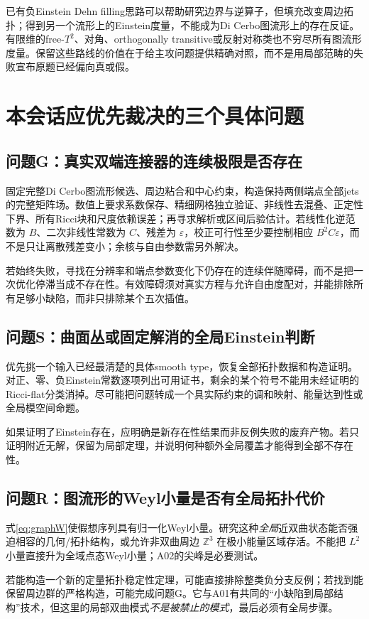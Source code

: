 \documentclass[UTF8,a4paper,11pt,fontset=fandol]{ctexart}
\numberwithin{equation}{section}
\theoremstyle{definition}
\newcommand{\Z}{\mathbb Z}
\begin{document}
已有负Einstein Dehn filling思路可以帮助研究边界与逆算子，但填充改变周边拓扑；得到另一个流形上的Einstein度量，不能成为Di Cerbo图流形上的存在反证。有限维的free-$T^2$、对角、orthogonally transitive或反射对称类也不穷尽所有图流形度量。保留这些路线的价值在于给主攻问题提供精确对照，而不是用局部范畴的失败宣布原题已经偏向真或假。

\section{本会话应优先裁决的三个具体问题}
\subsection{问题G：真实双端连接器的连续极限是否存在}
固定完整Di Cerbo图流形候选、周边粘合和中心约束，构造保持两侧端点全部jets的完整矩阵场。数值上要求系数保存、精细网格独立验证、非线性去混叠、正定性下界、所有Ricci块和尺度依赖误差；再寻求解析或区间后验估计。若线性化逆范数为 $B$、二次非线性常数为 $C$、残差为 $\varepsilon$，校正可行性至少要控制相应 $B^2C\varepsilon$，而不是只让离散残差变小；余核与自由参数需另外解决。

若始终失败，寻找在分辨率和端点参数变化下仍存在的连续伴随障碍，而不是把一次优化停滞当成不存在性。有效障碍须对真实方程与允许自由度配对，并能排除所有足够小缺陷，而非只排除某个五次插值。

\subsection{问题S：曲面丛或固定解消的全局Einstein判断}
优先挑一个输入已经最清楚的具体smooth type，恢复全部拓扑数据和构造证明。对正、零、负Einstein常数逐项列出可用证书，剩余的某个符号不能用未经证明的Ricci-flat分类消掉。尽可能把问题转成一个具实际约束的调和映射、能量达到性或全局模空间命题。

如果证明了Einstein存在，应明确是新存在性结果而非反例失败的废弃产物。若只证明附近无解，保留为局部定理，并说明何种额外全局覆盖才能得到全部不存在性。

\subsection{问题R：图流形的Weyl小量是否有全局拓扑代价}
式\eqref{eq:graphW}使假想序列具有归一化Weyl小量。研究这种\emph{全局}近双曲状态能否强迫相容的几何/拓扑结构，或允许非双曲周边 $\Z^3$ 在极小能量区域存活。不能把 $L^2$ 小量直接升为全域点态Weyl小量；A02的尖峰是必要测试。

若能构造一个新的定量拓扑稳定性定理，可能直接排除整类负分支反例；若找到能保留周边群的严格构造，可能完成问题G。它与A01有共同的“小缺陷到局部结构”技术，但这里的局部双曲模式\emph{不是被禁止的模式}，最后必须有全局步骤。
\end{document}
